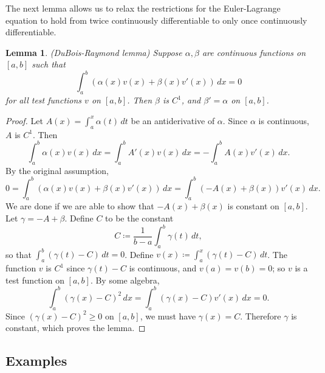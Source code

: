 \documentclass[11pt]{article}
\newtheorem{lemma}{Lemma}[subsection]
\begin{document}
The next lemma allows us to relax the restrictions for the Euler-Lagrange equation to hold from twice continuously differentiable to only once continuously differentiable.
\begin{lemma}
(DuBois-Raymond lemma) Suppose $\alpha, \beta$ are continuous functions on $[a,b]$ such that
\[
\int_a^b ( \alpha(x)v(x) + \beta(x)v'(x) ) \, dx = 0
\]
for all test functions $v$ on $[a,b]$. Then $\beta$ is $C^1$, and $\beta' = \alpha$ on $[a,b]$.
\end{lemma}
\begin{proof}
Let $A(x) = \int_a^x \alpha(t) \, dt$ be an antiderivative of $\alpha$. Since $\alpha$ is continuous, $A$ is $C^1$. Then
\[
\int_a^b \alpha(x) v(x) \, dx = \int_a^b A'(x)v(x) \, dx = -\int_a^b A(x)v'(x) \, dx.
\]
By the original assumption,
\[
0 = \int_a^b (\alpha(x)v(x) + \beta(x)v'(x)) \, dx = \int_a^b(-A(x) + \beta(x))v'(x) \, dx.
\]
We are done if we are able to show that $-A(x) + \beta(x)$ is constant on $[a,b]$. Let $\gamma = -A + \beta$. Define $C$ to be the constant
\[
C \coloneqq \frac{1}{b-a}\int_a^b \gamma(t) \, dt,
\]
so that $\int_a^b (\gamma(t) - C) \, dt = 0$. Define $v(x) \coloneqq \int_a^x (\gamma(t) - C) \, dt$. The function $v$ is $C^1$ since $\gamma(t) - C$ is continuous, and $v(a) = v(b) = 0$; so $v$ is a test function on $[a,b]$. By some algebra,
\[
\int_a^b (\gamma(x) - C)^2 \, dx = \int_a^b (\gamma(x) - C)v'(x) \, dx = 0.
\]
Since $(\gamma(x) - C)^2 \geq 0$ on $[a,b]$, we must have $\gamma(x) = C$. Therefore $\gamma$ is constant, which proves the lemma.
\end{proof}

\subsection{Examples}
\end{document}
